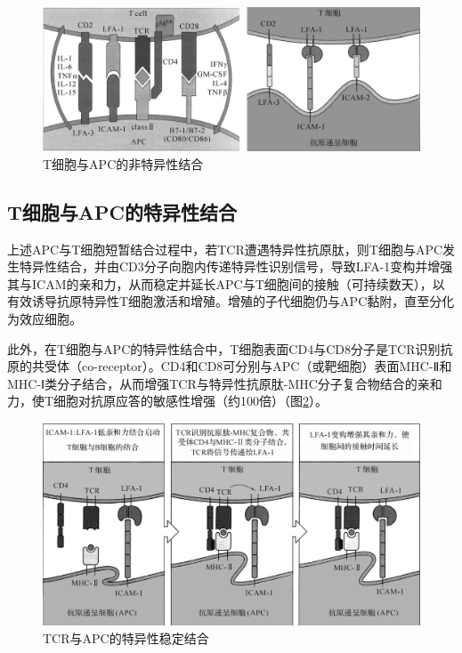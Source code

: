 \begin{figure}[!htbp]
 \centering
 \includegraphics{./images/Image00135.jpg}
 \captionsetup{justification=centering}
 \caption{T细胞与APC的非特异性结合}
 \label{fig9-9}
  \end{figure} 


\subsection{T细胞与APC的特异性结合}

上述APC与T细胞短暂结合过程中，若TCR遭遇特异性抗原肽，则T细胞与APC发生特异性结合，并由CD3分子向胞内传递特异性识别信号，导致LFA-1变构并增强其与ICAM的亲和力，从而稳定并延长APC与T细胞间的接触（可持续数天），以有效诱导抗原特异性T细胞激活和增殖。增殖的子代细胞仍与APC黏附，直至分化为效应细胞。

此外，在T细胞与APC的特异性结合中，T细胞表面CD4与CD8分子是TCR识别抗原的共受体（co-receptor）。CD4和CD8可分别与APC（或靶细胞）表面MHC-Ⅱ和MHC-Ⅰ类分子结合，从而增强TCR与特异性抗原肽-MHC分子复合物结合的亲和力，使T细胞对抗原应答的敏感性增强（约100倍）（图\ref{fig9-10}）。

\begin{figure}[!htbp]
 \centering
 \includegraphics{./images/Image00136.jpg}
 \captionsetup{justification=centering}
 \caption{TCR与APC的特异性稳定结合}
 \label{fig9-10}
  \end{figure} 


